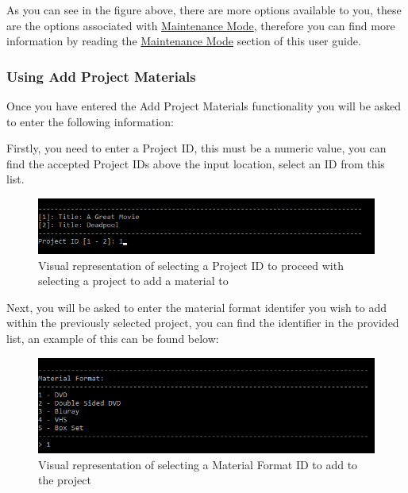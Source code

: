 \documentclass[
  english,
  a4paper,
,tablecaptionabove
]{scrartcl}
\begin{document}
As you can see in the figure above, there are more options available to
you, these are the options associated with
\protect\hyperlink{using-maintenance-mode}{Maintenance Mode}, therefore
you can find more information by reading the
\protect\hyperlink{using-maintenance-mode}{Maintenance Mode} section of
this user guide.

\newpage

\hypertarget{using-add-project-materials}{%
\subsubsection{Using Add Project
Materials}\label{using-add-project-materials}}

Once you have entered the Add Project Materials functionality you will
be asked to enter the following information:

Firstly, you need to enter a Project ID, this must be a numeric value,
you can find the accepted Project IDs above the input location, select
an ID from this list.

\begin{figure}
\centering
\includegraphics{images/user-guide/maintenance-mode/update-project-select-id.png}
\caption{Visual representation of selecting a Project ID to proceed with
selecting a project to add a material to}
\end{figure}

Next, you will be asked to enter the material format identifer you wish
to add within the previously selected project, you can find the
identifier in the provided list, an example of this can be found below:

\begin{figure}
\centering
\includegraphics{images/user-guide/maintenance-mode/add-material-select-id.png}
\caption{Visual representation of selecting a Material Format ID to add
to the project}
\end{figure}
\end{document}
